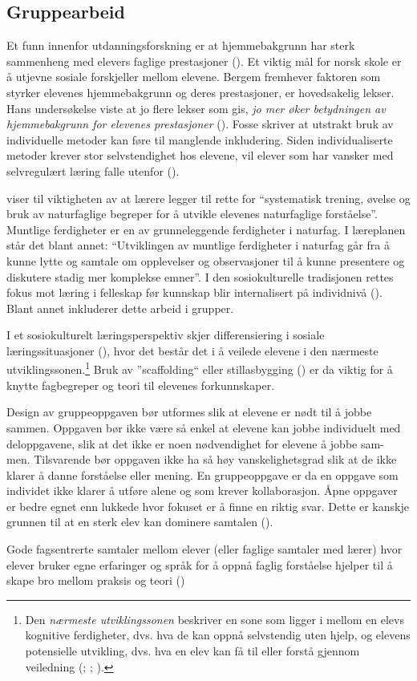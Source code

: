 \documentclass[main.tex]{subfiles}
\begin{document}
\subsection*{Gruppearbeid}

Et funn innenfor utdanningsforskning er at hjemmebakgrunn har sterk sammenheng med elevers faglige prestasjoner (). Et viktig mål for norsk skole er å utjevne sosiale forskjeller mellom elevene. Bergem fremhever faktoren som styrker elevenes hjemmebakgrunn og deres prestasjoner, er hovedsakelig lekser. Hans undersøkelse viste at jo flere lekser som gis, \emph{jo mer øker betydningen av hjemmebakgrunn for elevenes prestasjoner} (). Fosse skriver at utstrakt bruk av individuelle metoder kan føre til manglende inkludering. Siden individualiserte metoder krever stor selvstendighet hos elevene, vil elever som har vansker med selvregulært læring falle utenfor (). 

 viser til viktigheten av at lærere legger til rette for ``systematisk trening, øvelse og bruk av naturfaglige begreper for å utvikle elevenes naturfaglige forståelse''. Muntlige ferdigheter er en av grunneleggende ferdigheter i naturfag. I læreplanen står det blant annet: ``Utviklingen av muntlige ferdigheter i naturfag går fra å kunne lytte og samtale om opplevelser og observasjoner til å kunne presentere og diskutere stadig mer komplekse emner''. I den sosiokulturelle tradisjonen rettes fokus mot læring i felleskap før kunnskap blir internalisert på individnivå (). Blant annet inkluderer dette arbeid i grupper.


I et sosiokulturelt læringsperspektiv skjer differensiering i sosiale læringssituasjoner (), hvor det består det i å veilede elevene i den nærmeste utviklingssonen.\footnote[2]{Den \emph{nærmeste utviklingssonen} beskriver en sone som ligger i mellom en elevs kognitive ferdigheter, dvs. hva de kan oppnå selvstendig uten hjelp, og elevens potensielle utvikling, dvs. hva en elev kan få til eller forstå gjennom veiledning (; ; ).} Bruk av ''scaffolding`` eller stillasbygging () er da viktig for å knytte fagbegreper og teori til elevenes forkunnskaper.

Design av gruppeoppgaven bør utformes slik at
elevene er nødt til å jobbe sammen. Oppgaven bør ikke være så enkel at elevene kan jobbe
individuelt med deloppgavene, slik at det ikke er noen nødvendighet for elevene å jobbe sam-
men. Tilsvarende bør oppgaven ikke ha så høy vanskelighetsgrad slik at de ikke klarer å danne
forståelse eller mening. En gruppeoppgave er da en oppgave som individet ikke klarer å utføre
alene og som krever kollaborasjon. Åpne oppgaver er bedre egnet enn lukkede hvor fokuset er
å finne en riktig svar. Dette er kanskje grunnen til at en sterk elev kan dominere samtalen 
().

Gode fagsentrerte samtaler mellom elever (eller faglige samtaler med lærer) hvor elever bruker egne erfaringer og språk for å oppnå faglig forståelse hjelper til å skape bro mellom praksis og teori ()
\end{document}
